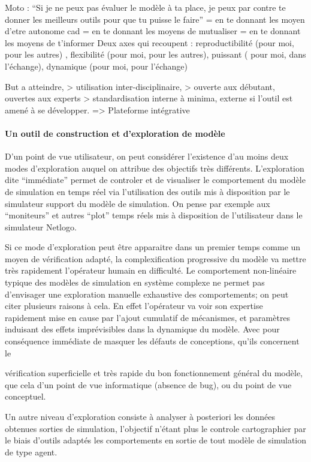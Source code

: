 Moto : \enquote{Si je ne peux pas évaluer le modèle à ta place, je peux par contre te donner les meilleurs outils pour que tu puisse le faire} 
= en te donnant les moyen d'etre autonome cad
= en te donnant les moyens de mutualiser
= en te donnant les moyens de t'informer 
Deux axes qui recoupent : reproductibilité (pour moi, pour les autres) , flexibilité (pour moi, pour les autres), puissant ( pour moi, dans l'échange), dynamique (pour moi, pour l'échange)

But a atteindre, 
> utilisation inter-disciplinaire, 
> ouverte aux débutant, ouvertes aux experts
> standardisation interne à minima, externe si l'outil est amené à se développer.
=> Plateforme intégrative 


\paragraph{Un outil de \textbf{construction} et d'\textbf{exploration} de modèle}

D'un point de vue utilisateur, on peut considérer l'existence d'au moins deux modes d'exploration auquel on attribue des objectifs très différents. L'exploration dite \enquote{immédiate} permet de controler et de visualiser le comportement du modèle de simulation en temps réel via l'utilisation des outils mis à disposition par le simulateur support du modèle de simulation. On pense par exemple aux \enquote{moniteurs} et autres \enquote{plot} temps réels mis à disposition de l'utilisateur dans le simulateur Netlogo. 

Si ce mode d'exploration peut être apparaitre dans un premier temps comme un moyen de vérification adapté, la complexification progressive du modèle va mettre très rapidement l'opérateur humain en difficulté. Le comportement non-linéaire typique des modèles de simulation en système complexe ne permet pas d'envisager une exploration manuelle exhaustive des comportements; on peut citer plusieurs raisons à cela. En effet l'opérateur va voir son expertise rapidement mise en cause par l'ajout cumulatif de mécanismes, et paramètres induisant des effets imprévisibles dans la dynamique du modèle. Avec pour conséquence immédiate de masquer les défauts de conceptions, qu'ils concernent le 

 vérification superficielle et très rapide du bon fonctionnement général du modèle, que cela d'un point de vue informatique (absence de bug), ou du point de vue conceptuel. 

Un autre niveau d'exploration consiste à analyser à posteriori les données obtenues sorties de simulation, l'objectif n'étant plus le controle cartographier par le biais d'outils adaptés les comportements en sortie de tout modèle de simulation de type agent. 

